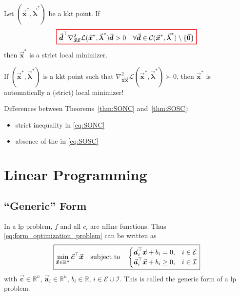 \documentclass[9pt, headings=standardclasses, parskip=half]{scrartcl}
\renewcommand{\emph}[1]{\textcolor{mypurple}{#1}}
\newcommand{\vect}[1]{\vec{\boldsymbol{#1}}}
\newcommand{\R}{\mathbb{R}}
\begin{document}
\begin{theorem}\label{thm:SOSC}
Let \( (\vect{x}^{\ast},\vect{\lambda}^{\ast}) \) be a \gls{kkt} point. If
\begin{equation}\label{eq:SOSC}
{\color{Red}
\setlength{\fboxrule}{1pt}
\boxed{ 
\color{black}
\vect{d}^{\top} \nabla^{2}_{\vect{x}\vect{x}} \mathcal{L}(\vect{x}^{\ast},\vect{\lambda}^{\ast}) \vect{d} > 0 \quad \forall \vect{d}\in\mathcal{C}(\vect{x}^{\ast},\vect{\lambda}^{\ast}) \setminus \{ \vect{0} \}
}
}
\end{equation}
then \( \vect{x}^{\ast} \) is a strict local minimizer.
\end{theorem}
If \((\vect{x}^{\ast},\vect{\lambda}^{\ast})\) is a \gls{kkt} point such that \(\nabla^{2}_{\vect{x}\vect{x}} \mathcal{L}(\vect{x}^{\ast},\vect{\lambda}^{\ast}) \succ 0\), then \(\vect{x}^{\ast}\) is automatically a (strict) local minimizer!

Differences between Theorems~\ref{thm:SONC} and~\ref{thm:SOSC}:
\begin{itemize}
\item strict inequality in \eqref{eq:SONC}
\item absence of the  in \eqref{eq:SOSC}
\end{itemize}


\clearpage


\section{Linear Programming}\label{sec:linear_programming}

\subsection{``Generic'' Form}\label{sec:genericform_linear_programming}

In a \gls{lp} problem, \(f\) and all \(c_i\) are affine functions.
Thus \eqref{eq:form_optimization_problem} can be written as
\begin{equation}\label{eq:form_linear_programming}
  \boxed{
  \min_{\vect{x} \in \mathbb{R}^{n}} \vect{c}^\top \vect{x} \quad \text{subject to} \quad
    \begin{cases}
      \vect{a}_i^\top \vect{x} + b_i = 0, & i \in \mathcal{E} \\
      \vect{a}_i^\top \vect{x} + b_i \geq 0, & i \in \mathcal{I}
    \end{cases}
     }
\end{equation}
with \(\vect{c} \in \R^{n}\), \(\vect{a}_i \in \R^{n}\), \(b_i \in \R\), \(i\in\mathcal{E}\cup\mathcal{I}\).
This is called the \emph{generic form} of a \gls{lp} problem.
\end{document}
